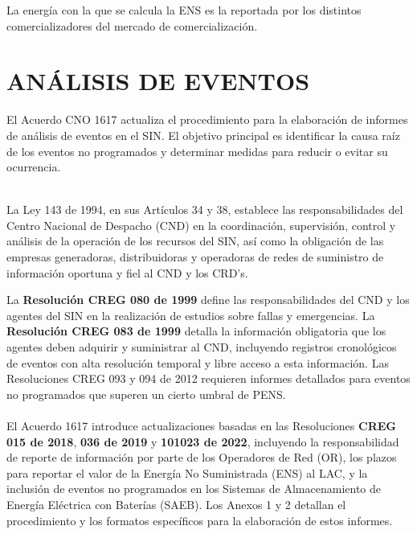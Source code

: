 \documentclass[a5paper]{book}%
\begin{document}
La energía con la que se calcula la \ac{ENS} es la reportada por los
distintos comercializadores del mercado de comercialización.

  \section{ANÁLISIS DE EVENTOS}

El Acuerdo CNO 1617 actualiza el procedimiento para la elaboración de informes de análisis de eventos en el \ac{SIN}. El objetivo principal es identificar la causa raíz de los eventos no programados y determinar medidas para reducir o evitar su ocurrencia.\\\\

\begin{center}
\begin{tcolorbox}
La Ley 143 de 1994, en sus Artículos 34 y 38, establece las responsabilidades del Centro Nacional de Despacho (CND) en la coordinación, supervisión, control y análisis de la operación de los recursos del SIN, así como la obligación de las empresas generadoras, distribuidoras y operadoras de redes de suministro de información oportuna y fiel al CND y los CRD's.
\end{tcolorbox}
\end{center}

La \textbf{Resolución CREG 080 de 1999} define las responsabilidades del CND y los agentes del SIN en la realización de estudios sobre fallas y emergencias. La \textbf{Resolución CREG 083 de 1999} detalla la información obligatoria que los agentes deben adquirir y suministrar al CND, incluyendo registros cronológicos de eventos con alta resolución temporal y libre acceso a esta información. Las Resoluciones CREG 093 y 094 de 2012 requieren informes detallados para eventos no programados que superen un cierto umbral de PENS.\\\\

El Acuerdo 1617 introduce actualizaciones basadas en las Resoluciones \textbf{CREG 015 de 2018}, \textbf{036 de 2019} y \textbf{101023 de 2022}, incluyendo la responsabilidad de reporte de información por parte de los Operadores de Red (OR), los plazos para reportar el valor de la Energía No Suministrada (ENS) al LAC, y la inclusión de eventos no programados en los Sistemas de Almacenamiento de Energía Eléctrica con Baterías (SAEB). Los Anexos 1 y 2 detallan el procedimiento y los formatos específicos para la elaboración de estos informes.
\end{document}
